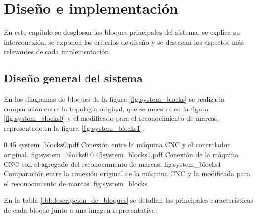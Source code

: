 \chapter{Diseño e implementación} %

\label{Chapter3}

En este capítulo se desglosan los bloques principales del sistema, se explica su interconexión, se exponen los criterios de diseño y se destacan los aspectos más relevantes de cada implementación.

\section{Diseño general del sistema}

En los diagramas de bloques de la figura \ref{fig:system_blocks} se realiza la comparación entre la topología original, que se muestra en la figura \ref{fig:system_blocks0} y el modificado para el reconocimiento de marcas, representado en la figura \ref{fig:system_blocks1}.

\subfigab 
{0.45} {system_blocks0.pdf} {Conexión entre la máquina CNC y el controlador original.} {fig:system_blocks0}
        {0.45}{system_blocks1.pdf} {Conexión de la máquina CNC con el agregado del reconocimiento de marcas.} {fig:system_blocks1}
        {Comparación entre la conexión original de la máquina CNC y la modificada para el reconocimiento de marcas.}
        {fig:system_blocks}

        En la tabla \ref{tbl:descripcion_de_bloques} se detallan las principales características de cada bloque junto a una imagen representativa:

